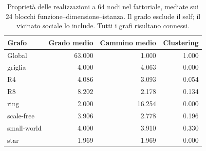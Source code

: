 \begin{table}[H]\centering\small
\caption{Proprietà delle realizzazioni a 64 nodi nel fattoriale, mediate sui 24 blocchi funzione--dimensione--istanza. Il grado esclude il self; il vicinato sociale lo include. Tutti i grafi risultano connessi.}\label{tab:graph-properties}
\begin{tabular}{@{}lrrr@{}}
\toprule Grafo & Grado medio & Cammino medio & Clustering\\\midrule
Global & 63.000 & 1.000 & 1.000\\
griglia & 4.000 & 4.063 & 0.000\\
R4 & 4.086 & 3.093 & 0.054\\
R8 & 8.202 & 2.178 & 0.134\\
ring & 2.000 & 16.254 & 0.000\\
scale-free & 3.906 & 2.778 & 0.196\\
small-world & 4.000 & 3.910 & 0.330\\
star & 1.969 & 1.969 & 0.000\\
\bottomrule\end{tabular}
\end{table}
